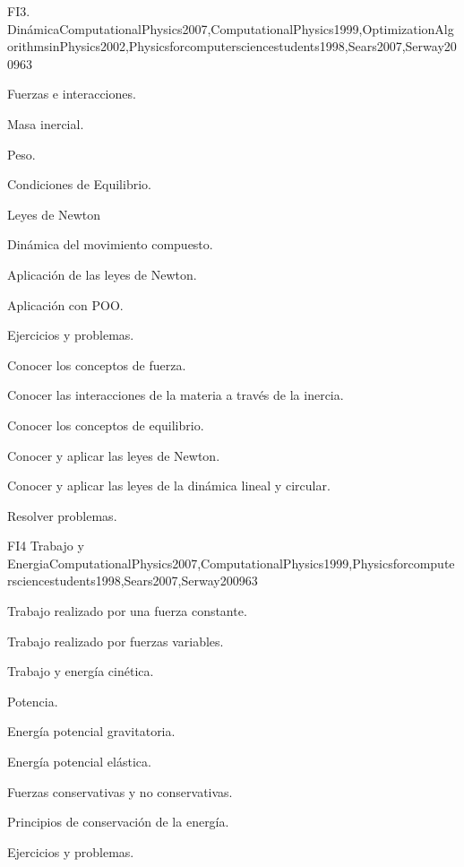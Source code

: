 \begin{syllabus}
\begin{unit}{FI3. Dinámica}{ComputationalPhysics2007,ComputationalPhysics1999,OptimizationAlgorithmsinPhysics2002,Physicsforcomputersciencestudents1998,Sears2007,Serway2009}{6}{3}
\begin{topics}
      \item Fuerzas e interacciones.
      \item Masa inercial.
      \item Peso.
      \item Condiciones de Equilibrio.
      \item Leyes de Newton
      \item Dinámica del movimiento compuesto.
      \item Aplicación de las leyes de Newton.
      \item Aplicación con POO.
      \item Ejercicios y problemas.
   \end{topics}

   \begin{learningoutcomes}
      \item Conocer los conceptos de fuerza.
      \item Conocer las interacciones de la materia a través de la inercia.
      \item Conocer los conceptos de equilibrio.
      \item Conocer y aplicar las leyes de Newton.      
      \item Conocer y aplicar las leyes de la dinámica lineal y circular.
      \item Resolver problemas.
   \end{learningoutcomes}
\end{unit}

\begin{unit}{FI4 Trabajo y Energia}{ComputationalPhysics2007,ComputationalPhysics1999,Physicsforcomputersciencestudents1998,Sears2007,Serway2009}{6}{3}
\begin{topics}
      \item Trabajo realizado por una fuerza constante.
      \item Trabajo realizado por fuerzas variables.
      \item Trabajo y energía cinética.
      \item Potencia.
      \item Energía potencial gravitatoria.
      \item Energía potencial elástica.
      \item Fuerzas conservativas y no conservativas.
      \item Principios de conservación de la energía.
      \item Ejercicios y problemas.
   \end{topics}


\end{unit}
\end{syllabus}
